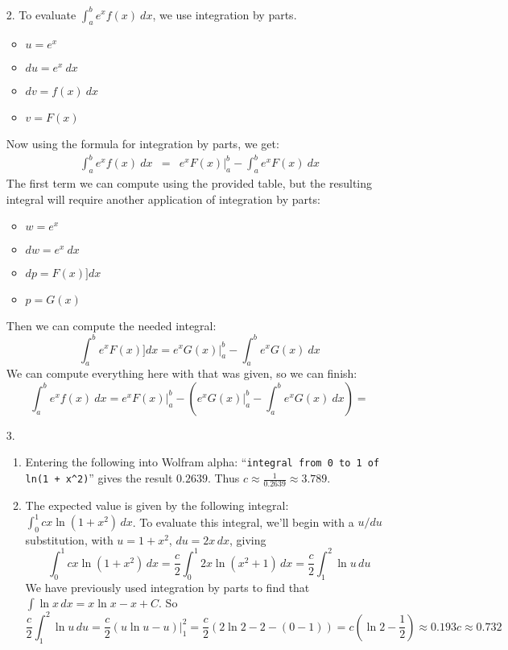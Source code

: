 \documentclass{article}
\begin{document}
    \begin{enumerate}
        \item[2.] To evaluate $\int_a^b e^xf(x)\ dx$, we use integration by parts.
        \begin{itemize}
            \item $u=e^x$
            \item $du = e^x\ dx$
            \item $dv = f(x)\ dx$
            \item $v=F(x)$
        \end{itemize}
        Now using the formula for integration by parts, we get:
        \begin{eqnarray*}
        \int_a^b e^xf(x)\ dx &=& e^xF(x)\biggr|_a^b - \int_a^b e^x F(x)\ dx 
        \end{eqnarray*}
        The first term we can compute using the provided table, but the resulting integral will require another application of integration by parts:
        \begin{itemize}
            \item $w = e^x$
            \item $dw = e^x\ dx$
            \item $dp = F(x)] dx$
            \item $p=G(x)$
        \end{itemize}
        Then we can compute the needed integral:
        \[\int_a^b e^x F(x)] dx =e^xG(x)\biggr|_a^b -\int_a^b e^x G(x)\ dx \]
        We can compute everything here with that was given, so we can finish:
        \[\int_a^b e^xf(x)\ dx = e^xF(x)\biggr|_a^b -\left(e^xG(x)\biggr|_a^b -\int_a^b e^x G(x)\ dx \right) =\]
        \item[3.] \begin{enumerate}
            \item Entering the following into Wolfram alpha:
            ``\verb!integral from 0 to 1 of ln(1 + x^2)!''
            gives the result $0.2639$. Thus $c \approx \frac{1}{0.2639} \approx 3.789$.
            \item The expected value is given by the following integral:
            $\int_0^1 cx\ln(1+x^2)\,dx$. To evaluate this integral, we'll begin with a $u/du$ substitution, with $u=1+x^2$, $du = 2x\,dx$, giving
            \[\int_0^1 cx\ln{(1+x^2)}\,dx = \frac{c}{2} \int_0^1 2x\ln(x^2+1)\,dx = \frac{c}{2}\int_1^2 \ln{u}\,du\]
            We have previously used integration by parts to find that $\int \ln{x} \,dx = x\ln{x}-x+C$. So
           \[ \frac{c}{2}\int_1^2 \ln{u}\,du = \frac{c}{2}(u\ln u - u)\Big|_1^2 =\frac{c}{2}(2\ln2-2 -(0-1)) =c(\ln2-\frac{1}{2})\approx0.193c \approx 0.732\]

        \end{enumerate}
        
    \end{enumerate}
\end{document}
